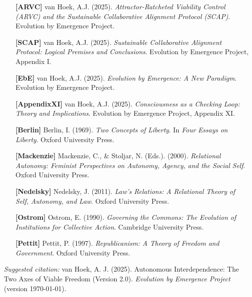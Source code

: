 \documentclass[11pt,a4paper]{article}
\begin{document}
\begin{itemize}[leftmargin=*,label={}]

\item[\textbf{[ARVC]}] van Hoek, A.J. (2025). \emph{Attractor-Ratcheted Viability Control (ARVC) and the Sustainable Collaborative Alignment Protocol (SCAP)}. Evolution by Emergence Project.

\item[\textbf{[SCAP]}] van Hoek, A.J. (2025). \emph{Sustainable Collaborative Alignment Protocol: Logical Premises and Conclusions}. Evolution by Emergence Project, Appendix I.

\item[\textbf{[EbE]}] van Hoek, A.J. (2025). \emph{Evolution by Emergence: A New Paradigm}. Evolution by Emergence Project.

\item[\textbf{[AppendixXI]}] van Hoek, A.J. (2025). \emph{Consciousness as a Checking Loop: Theory and Implications}. Evolution by Emergence Project, Appendix XI.

\item[\textbf{[Berlin]}] Berlin, I. (1969). \emph{Two Concepts of Liberty}. In \emph{Four Essays on Liberty}. Oxford University Press.

\item[\textbf{[Mackenzie]}] Mackenzie, C., \& Stoljar, N. (Eds.). (2000). \emph{Relational Autonomy: Feminist Perspectives on Autonomy, Agency, and the Social Self}. Oxford University Press.

\item[\textbf{[Nedelsky]}] Nedelsky, J. (2011). \emph{Law's Relations: A Relational Theory of Self, Autonomy, and Law}. Oxford University Press.

\item[\textbf{[Ostrom]}] Ostrom, E. (1990). \emph{Governing the Commons: The Evolution of Institutions for Collective Action}. Cambridge University Press.

\item[\textbf{[Pettit]}] Pettit, P. (1997). \emph{Republicanism: A Theory of Freedom and Government}. Oxford University Press.

\end{itemize}

\vspace{1em}
\noindent\textit{Suggested citation:} van Hoek, A. J. (2025). Autonomous Interdependence: The Two Axes of Viable Freedom (Version 2.0). \emph{Evolution by Emergence Project} (version \today).
\end{document}
